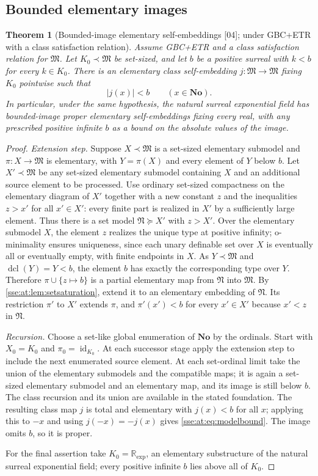 \documentclass[11pt,a4paper]{article}
\numberwithin{equation}{section}
\theoremstyle{plain}
\newtheorem{theorem}{Theorem}[section]
\theoremstyle{definition}
\theoremstyle{remark}
\newcommand{\No}{\mathbf{No}}
\newcommand{\R}{\mathbb{R}}
\newcommand{\id}{\operatorname{id}}
\newcommand{\src}[1]{\textup{\textsf{\small[#1]}}}%
\newcommand{\dclat}{\operatorname{dcl}}
\newcommand{\Mat}{\mathfrak{M}}
\newcommand{\Nat}{\mathfrak{N}}
\begin{document}
\subsection{Bounded elementary images}
\begin{theorem}[Bounded-image elementary self-embeddings \src{04}; under GBC+ETR with a class satisfaction relation]
\label{sse:at:thm:bounded-elementary}
Assume GBC+ETR and a class satisfaction relation for $\Mat$. Let
$K_0\prec\Mat$ be set-sized, and let $b$ be a positive surreal with $k<b$ for
every $k\in K_0$. There is an elementary class self-embedding
$j:\Mat\to\Mat$ fixing $K_0$ pointwise such that
\begin{equation}\label{sse:at:eq:modelbound}
 |j(x)|<b\qquad(x\in\No).
\end{equation}
In particular, under the same hypothesis, the natural surreal exponential
field has bounded-image proper elementary self-embeddings fixing every real,
with any prescribed positive infinite $b$ as a bound on the absolute values
of the image.
\end{theorem}
\begin{proof}
\emph{Extension step.} Suppose $X\prec\Mat$ is a set-sized elementary
submodel and $\pi:X\to\Mat$ is elementary, with $Y=\pi(X)$ and every element
of $Y$ below $b$. Let $X'\prec\Mat$ be any set-sized elementary submodel
containing $X$ and an additional source element to be processed. Use
ordinary set-sized compactness on the elementary diagram of $X'$ together
with a new constant $z$ and the inequalities $z>x'$ for all $x'\in X'$: every
finite part is realized in $X'$ by a sufficiently large element. Thus there
is a set model $\Nat\succeq X'$ with $z>X'$. Over the elementary submodel $X$,
the element $z$ realizes the unique type at positive infinity; o-minimality
ensures uniqueness, since each unary definable set over $X$ is eventually all
or eventually empty, with finite endpoints in $X$. As $Y\prec\Mat$ and
$\dclat(Y)=Y<b$, the element $b$ has exactly the corresponding type over $Y$.
Therefore $\pi\cup\{z\mapsto b\}$ is a partial elementary map from $\Nat$
into $\Mat$. By \cref{sse:at:lem:setsaturation}, extend it to an elementary
embedding of $\Nat$. Its restriction $\pi'$ to $X'$ extends $\pi$, and
$\pi'(x')<b$ for every $x'\in X'$ because $x'<z$ in $\Nat$.

\emph{Recursion.} Choose a set-like global enumeration of $\No$ by the
ordinals. Start with $X_0=K_0$ and $\pi_0=\id_{K_0}$. At each successor stage
apply the extension step to include the next enumerated source element. At
each set-ordinal limit take the union of the elementary submodels and the
compatible maps; it is again a set-sized elementary submodel and an
elementary map, and its image is still below $b$. The class recursion and
its union are available in the stated foundation. The resulting class map
$j$ is total and elementary with $j(x)<b$ for all $x$; applying this to $-x$
and using $j(-x)=-j(x)$ gives \eqref{sse:at:eq:modelbound}. The image omits
$b$, so it is proper.

For the final assertion take $K_0=\R_{\exp}$, an elementary substructure of
the natural surreal exponential field; every positive infinite $b$ lies above
all of $K_0$.
\end{proof}
\end{document}
